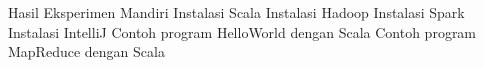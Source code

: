 Hasil Eksperimen Mandiri
Instalasi Scala
Instalasi Hadoop
Instalasi Spark
Instalasi IntelliJ
Contoh program HelloWorld dengan Scala
Contoh program MapReduce dengan Scala